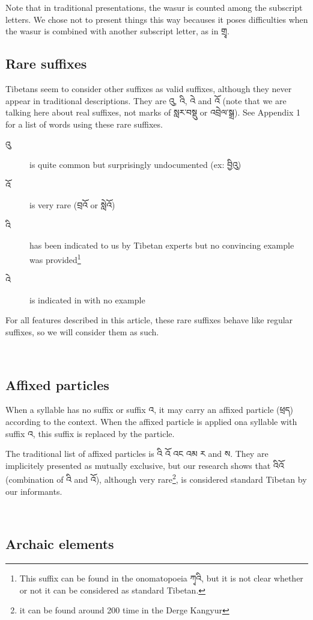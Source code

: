 \documentclass[%
a4paper,%
pagesize,%
12pt,%
parskip=off,%
bibliography=totoc,%
numbers=noenddot,%
DIV=12,%
twoside=semi,%
headings=normal%
]{scrartcl}
\begin{document}
Note that in traditional presentations, the wasur is counted among the subscript letters. We chose not to present things this way becauses it poses difficulties when the wasur is combined with another subscript letter, as in གྲྭ.

\subsection{Rare suffixes}

Tibetans seem to consider other suffixes as valid suffixes, although they never appear in traditional descriptions. They are འུ, འི, འེ and འོ (note that we are talking here about real suffixes, not marks of སླར་བསྡུ or འབྲེལ་སྒྲ). See Appendix 1 for a list of words using these rare suffixes.

\begin{description}
 \item[འུ] is quite common but surprisingly undocumented (ex: བྱིའུ)
 \item[འོ] is very rare (བྲའོ or སླེའོ)
 \item[འི] has been indicated to us by Tibetan experts but no convincing example was provided\footnote{This suffix can be found in the onomatopoeia ཀྭའི, but it is not clear whether or not it can be considered as standard Tibetan.}
 \item[འེ] is indicated in \cite{TournadreMST} with no example
\end{description}

For all features described in this article, these rare suffixes behave like regular suffixes, so we will consider them as such.

­\subsection{Affixed particles}

When a syllable has no suffix or suffix འ, it may carry an affixed particle (ཕྲད) according to the context. When the affixed particle is applied ona syllable with suffix འ, this suffix is replaced by the particle.

The traditional list of affixed particles is འི འོ འང འམ ར and ས. They are implicitely presented as mutually exclusive, but our research shows that འིའོ (combination of འི and འོ), although very rare\footnote{it can be found around 200 time in the Derge Kangyur}, is considered standard Tibetan by our informants.

­\subsection{Archaic elements}
\end{document}
